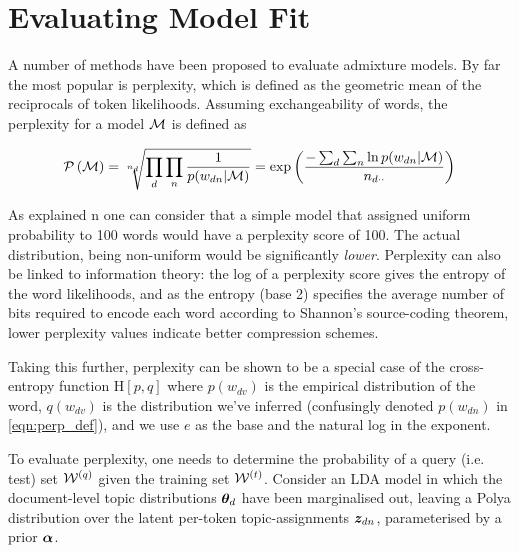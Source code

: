  

\section{Evaluating Model Fit}
\label{sec:chap1:eval}

A number of methods have been proposed to evaluate admixture models. By far the most popular is perplexity, which is defined as the geometric mean of the reciprocals of token likelihoods. Assuming exchangeability of words, the perplexity for a model $\mathcal{M}$ is defined as

\begin{align}
\mathcal{P} \left( { \mathcal{M} } \right) = \sqrt[n_{d}]{\prod_d \prod_n \frac{1}{p(w_{dn}|\mathcal{M})}} = \exp \left( \frac{-\sum_d \sum_n \ln p(w_{dn}|\mathcal{M})}{n_{d\cdot\cdot}} \right) \label{eqn:perp_def}
\end{align}

As explained n \cite{Goodman2001} one can consider that a simple model that assigned uniform probability to 100 words would have a perplexity score of 100. The actual distribution, being non-uniform would be significantly \emph{lower}. Perplexity can also be linked to information theory: the log of a perplexity score gives the entropy of the word likelihoods, and as the entropy (base 2) specifies the average number of bits required to encode each word according to Shannon's source-coding theorem, lower perplexity values indicate better compression schemes.

Taking this further, perplexity can be shown to be a special case of the cross-entropy function $\text{H}[p,q]$ where $p(w_{dv})$ is the empirical distribution of the word, $q(w_{dv})$ is the distribution we've inferred (confusingly denoted $p(w_{dn})$ in \eqref{eqn:perp_def}), and we use $e$ as the base and the natural log in the exponent. 

To evaluate perplexity, one needs to determine the probability of a query (i.e. test) set $\mathcal{W}^{(q)}$ given the training set $\mathcal{W}^{(t)}$. Consider an LDA model in which the document-level topic distributions ${ \bm \theta_d }$ have been marginalised out, leaving a Polya distribution over the latent per-token topic-assignments ${ \bm z_{dn} }$, parameterised by a prior $\bm \alpha$.

